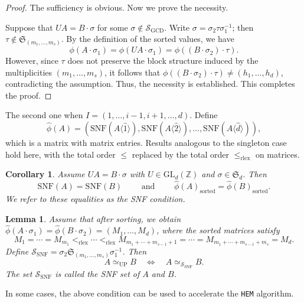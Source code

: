 \documentclass[reqno, 12pt]{article}
\newtheorem{cor}[thm]{Corollary}
\newtheorem{lem}[thm]{Lemma}
\theoremstyle{mydefinition}
\theoremstyle{myremark}
\numberwithin{algorithm}{section}
\def\Z{\mathbb{Z}}
\begin{document}
\begin{proof}
The sufficiency is obvious. Now we prove the necessity.

Suppose that $UA = B \cdot \sigma$ for some $\sigma \notin \mathcal{S}_{\mathrm{GCD}}$. Write $\sigma = \sigma_2 \tau \sigma_1^{-1}$; then $\tau \notin \mathfrak{S}_{(m_1,\dots,m_s)}$. By the definition of the sorted values, we have
\[
\phi(A \cdot \sigma_1) = \phi(UA \cdot \sigma_1) = \phi((B \cdot \sigma_2) \cdot \tau).
\]
However, since $\tau$ does not preserve the block structure induced by the multiplicities $(m_1, \dots, m_s)$, it follows that $\phi((B \cdot \sigma_2) \cdot \tau) \neq (h_1, \dots, h_d)$, contradicting the assumption. Thus, the necessity is established. This completes the proof.
\end{proof}

The second one when $I = (1, \dots, i-1, i+1, \dots, d)$. Define
\[
\hat{\phi}(A) = \left( \mathrm{SNF}(A\langle \hat{1}\rangle), \mathrm{SNF}(A\langle \hat{2}\rangle), \dots, \mathrm{SNF}(A\langle \hat{d}\rangle) \right),
\]
which is a matrix with matrix entries. Results analogous to the singleton case hold here, with the total order $\leq$ replaced by the total order $\leq_{\mathrm{rlex}}$ on matrices.


\begin{cor}\label{SNF-condition}
Assume $UA=B\cdot\sigma$ with $U\in\mathrm{GL}_d(\Z)$ and $\sigma\in \mathfrak{S}_d$. Then
\[
\mathrm{SNF}(A) = \mathrm{SNF}(B)\qquad \text{ and } \qquad
\hat{\phi}(A)_{\mathrm{sorted}} = \hat{\phi}(B)_{\mathrm{sorted}}.
\]
We refer to these equalities as the \emph{SNF condition}.
\end{cor}

\begin{lem}
Assume that after sorting, we obtain $\hat{\phi}(A \cdot \sigma_1) = \hat{\phi}(B \cdot \sigma_2) = (M_1, \dots, M_d)$, where the sorted matrices satisfy
\[
M_{1} = \cdots = M_{m_1}
<_{\mathrm{rlex}} \cdots <_{\mathrm{rlex}}
M_{m_1+\cdots+m_{s-1}+1} = \cdots = M_{m_1+\cdots+m_{s-1}+m_s} = M_d.
\]
Define $\mathcal{S}_{\mathrm{SNF}} = \sigma_2 \mathfrak{S}_{(m_1,\dots,m_s)} \sigma_1^{-1}$. Then
\[
A \simeq_{\mathrm{UP}} B \quad \Longleftrightarrow \quad A \simeq_{\mathcal{S}_{\mathrm{SNF}}} B.
\]
The set $\mathcal{S}_{\mathrm{SNF}}$ is called the \emph{SNF set} of $A$ and $B$.
\end{lem}

In some cases, the above condition can be used to accelerate the \texttt{HEM} algorithm.
\end{document}
